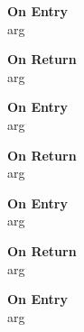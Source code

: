 %
%


\begin{description}
\item[\bf On Entry]
\item[arg]
\end{description}

\begin{description}
\item[\bf On Return]
\item[arg] 
\end{description}



%
%


\begin{description}
\item[\bf On Entry]
\item[arg]
\end{description}

\begin{description}
\item[\bf On Return]
\item[arg] 
\end{description}



%
%


\begin{description}
\item[\bf On Entry]
\item[arg]
\end{description}

\begin{description}
\item[\bf On Return]
\item[arg] 
\end{description}



%
%


\begin{description}
\item[\bf On Entry]
\item[arg]
\end{description}

